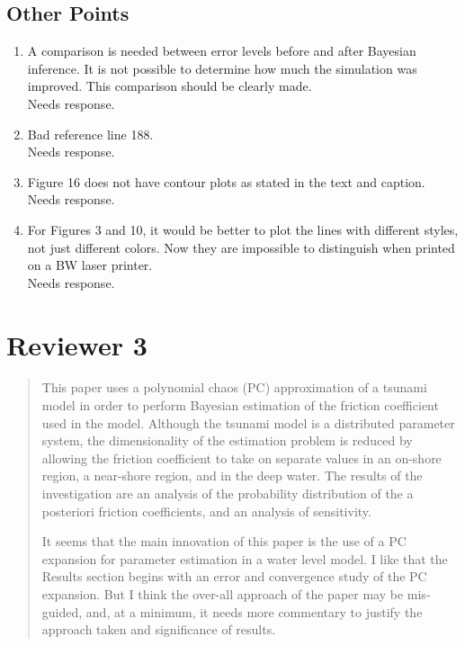 \documentclass[]{article}
\newcommand{\alert}[1]{{\color{red} #1}}
\begin{document}
\subsection*{Other Points}
\begin{enumerate}
\item A comparison is needed between error levels before and after Bayesian inference. It is not possible to determine how much the simulation was improved. This comparison should be clearly made.\\

\alert{Needs response.} \\

\item Bad reference line 188.\\

\alert{Needs response.} \\

\item Figure 16 does not have contour plots as stated in the text and caption. \\

\alert{Needs response.} \\

\item For Figures 3 and 10, it would be better to plot the lines with different styles, not just different colors. Now they are impossible to distinguish when printed on a BW laser printer.\\

\alert{Needs response.} \\

\end{enumerate}
 

\section*{Reviewer 3}
\begin{quote}
This paper uses a polynomial chaos (PC) approximation of a tsunami model in order to perform Bayesian estimation of the friction coefficient used in the model. Although the tsunami model is a distributed parameter system, the dimensionality of the estimation problem is reduced by allowing the friction coefficient to take on separate values in an on-shore region, a near-shore region, and in the deep water. The results of the investigation are an analysis of the probability distribution of the a posteriori friction coefficients, and an analysis of sensitivity.

It seems that the main innovation of this paper is the use of a PC expansion for parameter estimation in a water level model. I like that the Results section begins with an error and convergence study of the PC expansion. But I think the over-all approach of the paper may be mis-guided, and, at a minimum, it needs more commentary to justify the approach taken and significance of results.
\end{quote}
\end{document}
